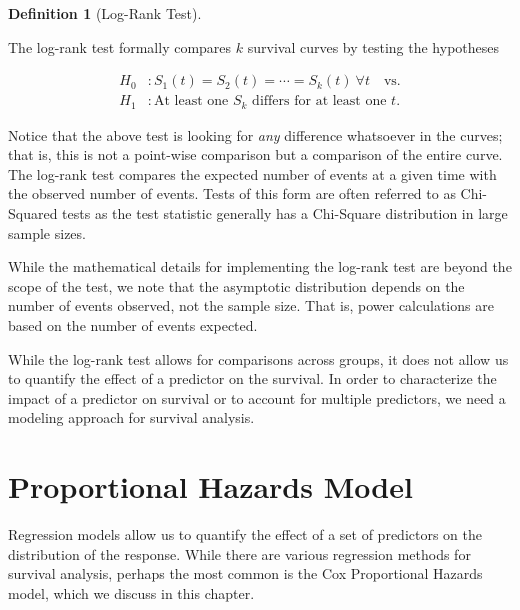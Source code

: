 \documentclass[
  letterpaper,
  DIV=11,
  numbers=noendperiod]{scrreprt}
\theoremstyle{definition}
\newtheorem{definition}{Definition}[chapter]
\theoremstyle{definition}
\theoremstyle{remark}
\begin{document}
\begin{definition}[Log-Rank
Test]\protect\hypertarget{def-log-rank}{}\label{def-log-rank}

The log-rank test formally compares \(k\) survival curves by testing the
hypotheses

\[
\begin{aligned}
  H_0&: S_1(t) = S_2(t) = \dotsb = S_k(t) \ \forall t \quad \text{vs.} \\
  H_1&: \text{At least one } S_k \text{ differs for at least one } t.
\end{aligned}
\]

\end{definition}

Notice that the above test is looking for \emph{any} difference
whatsoever in the curves; that is, this is not a point-wise comparison
but a comparison of the entire curve. The log-rank test compares the
expected number of events at a given time with the observed number of
events. Tests of this form are often referred to as Chi-Squared tests as
the test statistic generally has a Chi-Square distribution in large
sample sizes.

While the mathematical details for implementing the log-rank test are
beyond the scope of the test, we note that the asymptotic distribution
depends on the number of events observed, not the sample size. That is,
power calculations are based on the number of events expected.

While the log-rank test allows for comparisons across groups, it does
not allow us to quantify the effect of a predictor on the survival. In
order to characterize the impact of a predictor on survival or to
account for multiple predictors, we need a modeling approach for
survival analysis.

\hypertarget{sec-surv-cph}{%
\chapter{Proportional Hazards Model}\label{sec-surv-cph}}

\providecommand{\norm}[1]{\left\lVert#1\right\rVert}
\providecommand{\abs}[1]{\left\lvert#1\right\rvert}
\providecommand{\dist}[1]{\stackrel{\text{#1}}{\sim}}
\providecommand{\ind}[1]{\mathbb{I}\left(#1\right)}
\providecommand{\bm}[1]{\mathbf{#1}}
\providecommand{\bs}[1]{\boldsymbol{#1}}
\providecommand{\Ell}{\mathcal{L}}
\providecommand{\indep}{\perp\negthickspace\negmedspace\perp}

Regression models allow us to quantify the effect of a set of predictors
on the distribution of the response. While there are various regression
methods for survival analysis, perhaps the most common is the Cox
Proportional Hazards model, which we discuss in this chapter.
\end{document}
